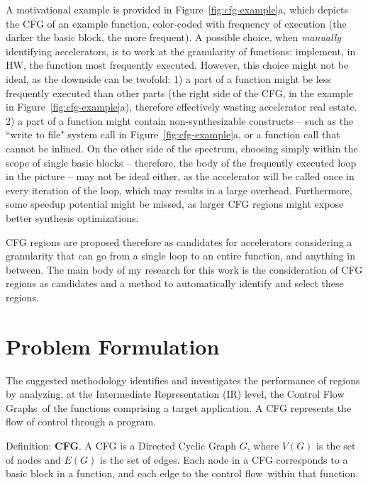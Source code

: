 \documentclass[]{usiinfthesis}
\newcommand{\controlflow}{control flow}
\newcommand{\CFGs}{Control Flow Graphs}
\begin{document}
A motivational example is provided in Figure~\ref{fig:cfg-example}a,
which depicts the CFG of an example function, color-coded with
frequency of execution (the darker the basic block, the more
frequent). A possible choice, when \emph{manually} identifying
accelerators, is to work at the granularity of functions: implement,
in HW, the function most frequently executed. However, this choice
might not be ideal, as the downside can be twofold: 1) a part of a
function might be less frequently executed than other parts (the right
side of the CFG, in the example in Figure~\ref{fig:cfg-example}a),
therefore effectively wasting accelerator real estate. 2) a part of a
function might contain non-synthesizable constructs -- such as the
``write to file" system call in Figure~\ref{fig:cfg-example}a, or a function 
call that cannot be inlined.  On the
other side of the spectrum, choosing simply within the scope of single
basic blocks -- therefore, the body of the frequently executed loop
in the picture -- may not be ideal either, as the accelerator will be
called once in every iteration of the loop, which may results in a
large overhead. Furthermore, some speedup potential might be missed,
as larger CFG regions might expose better synthesis optimizations.\par

CFG regions are proposed therefore as candidates for
accelerators considering a granularity that can go from a
single loop to an entire function, and anything in between. 
The main body of my research for this work is the consideration 
of CFG regions as candidates and a method to 
automatically identify and select these regions.

%
%
%
%
%
%
%

\section{Problem Formulation}
\label{sec:prob}

The suggested methodology identifies and investigates the performance of regions
by analyzing, at the Intermediate Representation (IR) level, the
\CFGs\ of the functions comprising a target application. A CFG
represents the flow of control through a program.\par

Definition: \textbf{CFG}. A CFG is a Directed Cyclic Graph $G$, where
$V(G)$ is the set of nodes and $E(G)$ is the set of edges. Each node
in a CFG corresponds to a basic block in a function, and each edge to
the \controlflow\ within that function.\par
\end{document}
